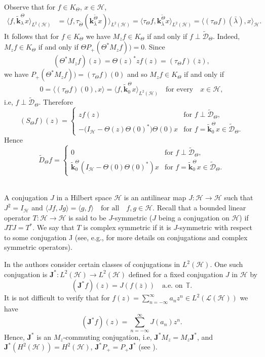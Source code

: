 \documentclass[11pt]{amsart}
\numberwithin{equation}{section}
\newcommand{\hsp}{\mathcal{H}}
\newcommand{\oL }{\mathcal{L}(\hsp) }
\newcommand{\ke}{{\mathbf{k}}}
\newcommand{\J}{{\mathbf{J}}}
\theoremstyle{definition}
\numberwithin{equation}{section}
\begin{document}
Observe that for $f\in K_{\Theta}$, $x\in\hsp$,
\begin{align*}
\langle f, \widetilde{\ke}_{\lambda}^{\Theta}x\rangle_{L^{2}(\hsp)}&=
\langle f,\tau_{\widetilde{\Theta}}(\ke_{\bar\lambda}^{\widetilde{\Theta}}x)\rangle_{L^{2}(\hsp)}
=\langle \tau_{\Theta}f,\ke_{\bar\lambda}^{\widetilde{\Theta}}x\rangle_{L^{2}(\hsp)}=\langle (\tau_{\Theta}f)(\bar\lambda),x\rangle_{\hsp}.
\end{align*}
It follows that for $f\in K_{\Theta}$ we have $M_zf\in K_{\Theta}$ if and only if $f\perp\widetilde{\mathcal{D}}_{\Theta}$. Indeed, $M_zf\in K_\Theta$ if and only if $\Theta P_+(\Theta^{*}M_zf))=0$. Since
$$(\Theta^{*}M_zf)(z)=\Theta(z)^*zf(z)=(\tau_{\Theta}f)(\overline{z}),$$
we have $P_+(\Theta^{*}M_zf))=(\tau_{\Theta}f)(0)$ and so $M_{z}f\in K_{\Theta}$ if and only if
$$0=\langle(\tau_{\Theta}f)(0),x\rangle=\langle f, \widetilde{\ke}_{0}^{\Theta}x\rangle_{L^{2}(\hsp)}\quad \text{for every}\quad x\in \hsp,$$
i.e, $f\perp\widetilde{\mathcal{D}}_{\Theta}$. Therefore
$$(S_{\Theta}f)(z)=\left\{\begin{array}{cl}
 z f(z)&\text{for }f\perp\widetilde{\mathcal{D}}_{\Theta},\\
-\big(I_{\hsp}-\Theta(z)\Theta(0)^*\big)\Theta(0)x&\text{for }f=\widetilde{\ke}_{0}^{\Theta}x\in\widetilde{\mathcal{D}}_{\Theta}.
\end{array}\right.$$
Hence
$$\widetilde{{D}}_{\Theta}f=\left\{\begin{array}{cl}
0&\text{for }f\perp\widetilde{\mathcal{D}}_{\Theta},\\
\widetilde{\ke}_{0}^{\Theta}(I_{\hsp}-\Theta(0)\Theta(0)^*)x&\text{for }f=\widetilde{\ke}_{0}^{\Theta}x\in\widetilde{\mathcal{D}}_{\Theta}.
\end{array}\right.$$~\label{d}

A conjugation $J$ in a Hilbert space
$\hsp$ is an antilinear map $J:\hsp\longrightarrow \hsp$ such that $J^2=I_\hsp$ and
$\langle Jf,Jg\rangle=\langle g, f\rangle \quad \text{for all}\quad f,g\in \hsp$.
Recall that a bounded linear operator $T:\hsp\longrightarrow\hsp$ is said to be $J$-symmetric ($J$ being a conjugation on $\hsp$) if $JTJ=T^*$. We say that $T$ is complex symmetric if it is $J$-symmetric with respect
to some conjugation J (see, e.g., \cite{GP} for more details on conjugations
and complex symmetric operators).

In \cite{CKLP} the authors consider certain classes of conjugations in $L^2(\hsp)$. One such conjugation is $\J^*:L^2(\hsp)\to L^2(\hsp)$ defined for a fixed conjugation $J$ in $\hsp$ by
\begin{equation}\label{J}
(\J^*f)(z)=J(f(\overline{z}))\quad \text{a.e. on}~~\mathbb{T}.
\end{equation}
It is not difficult to verify that for $f(z)=\sum_{n=-\infty}^{\infty}a_nz^n\in L^{2}(\oL)$ we have
$$(\J^*f)(z)=\sum_{n=-\infty}^{\infty}J(a_n)z^n.$$
Hence, $\J^*$ is an $M_z$-commuting conjugation, i.e, $\J^*M_z=M_z\J^*$, and $\J^*(H^{2}(\hsp))=H^{2}(\hsp)$, $\J^*P_+=P_+\J^*$ (see \cite[Section 4]{CKLP}).
\end{document}
